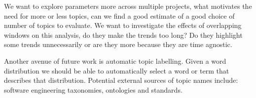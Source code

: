 \documentclass[times, 10pt,twocolumn]{article}
\newcommand{\shrinkit}{\vspace*{-.3em}}
\begin{document}
\shrinkit
{}
\shrinkit
\shrinkit

We want to explore parameters more across multiple projects, what
motivates the need for more or less topics, can we find a good
estimate of a good choice of number of topics to evaluate. We want to
investigate the effects of overlapping windows on this analysis, do
they make the trends too long? Do they highlight some trends
unnecessarily or are they more because they are time agnostic.

Another avenue of future work is automatic topic labelling. Given a word
distribution we should be able to automatically select a word or term
that describes that distribution. Potential external sources of topic
names include: software engineering taxonomies, ontologies and
standards.


\shrinkit


\shrinkit


%


\end{document}

